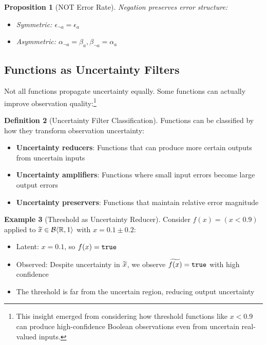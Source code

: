 \documentclass[11pt,twoside,openright]{book}
\theoremstyle{definition}
\newtheorem{definition}{Definition}[chapter]
\newtheorem{example}[definition]{Example}
\theoremstyle{plain}
\newtheorem{proposition}[definition]{Proposition}
\theoremstyle{remark}
\begin{document}
\begin{proposition}[NOT Error Rate]
Negation preserves error structure:
\begin{itemize}
    \item Symmetric: $\epsilon_{\neg a} = \epsilon_a$
    \item Asymmetric: $\alpha_{\neg a} = \beta_a, \beta_{\neg a} = \alpha_a$
\end{itemize}
\end{proposition}

\subsection{Functions as Uncertainty Filters}

Not all functions propagate uncertainty equally. Some functions can actually improve observation quality:\footnote{This insight emerged from considering how threshold functions like $x < 0.9$ can produce high-confidence Boolean observations even from uncertain real-valued inputs.}

\begin{definition}[Uncertainty Filter Classification]
Functions can be classified by how they transform observation uncertainty:
\begin{itemize}
    \item \textbf{Uncertainty reducers}: Functions that can produce more certain outputs from uncertain inputs
    \item \textbf{Uncertainty amplifiers}: Functions where small input errors become large output errors
    \item \textbf{Uncertainty preservers}: Functions that maintain relative error magnitude
\end{itemize}
\end{definition}

\begin{example}[Threshold as Uncertainty Reducer]
Consider $f(x) = (x < 0.9)$ applied to $\widetilde{x} \in \mathcal{B}\langle \mathbb{R}, 1 \rangle$ with $x = 0.1 \pm 0.2$:
\begin{itemize}
    \item Latent: $x = 0.1$, so $f(x) = \mathtt{true}$
    \item Observed: Despite uncertainty in $\widetilde{x}$, we observe $\widetilde{f(x)} = \mathtt{true}$ with high confidence
    \item The threshold is far from the uncertain region, reducing output uncertainty
\end{itemize}
\end{example}
\end{document}
